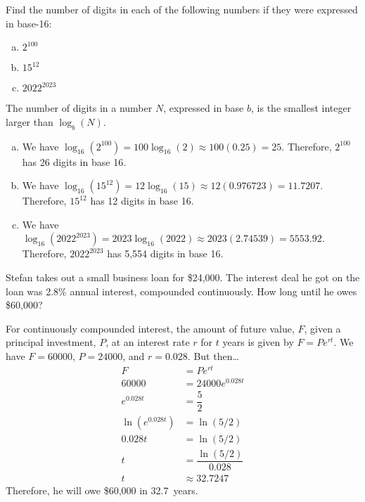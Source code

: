 \documentclass[11pt,letterpaper]{article}
\begin{document}
\newpage



 Find the number of digits in each of the following numbers if they were expressed in base-16:
	\begin{enumerate}[(a)]
	\item $2^{100}$
	\item $15^{12}$
	\item $2022^{2023}$
	\end{enumerate} \pspace

\sol The number of digits in a number $N$, expressed in base $b$, is the smallest integer larger than $\log_b(N)$. 
\begin{enumerate}[(a)]
\item We have $\log_{16}(2^{100})= 100 \log_{16}(2) \approx 100(0.25)= 25$. Therefore, $2^{100}$ has 26 digits in base 16. \pspace

\item We have $\log_{16}(15^{12})= 12 \log_{16}(15) \approx 12(0.976723)= 11.7207$. Therefore, $15^{12}$ has 12 digits in base 16. \pspace
 
\item We have $\log_{16}(2022^{2023})= 2023 \log_{16}(2022) \approx 2023(2.74539)= 5553.92$. Therefore, $2022^{2023}$ has 5,554 digits in base 16.  
\end{enumerate}



\newpage



 Stefan takes out a small business loan for \$24,000. The interest deal he got on the loan was 2.8\% annual interest, compounded continuously. How long until he owes \$60,000? \pspace

\sol For continuously compounded interest, the amount of future value, $F$, given a principal investment, $P$, at an interest rate $r$ for $t$ years is given by $F= Pe^{rt}$. We have $F= 60000$, $P= 24000$, and $r= 0.028$. But then\dots \pspace
	\[
	\begin{aligned}
	F&= Pe^{rt} \\[0.3cm]
	60000&= 24000 e^{0.028t} \\[0.3cm]
	e^{0.028t}&= \dfrac{5}{2} \\[0.3cm]
	\ln(e^{0.028t})&= \ln(5/2) \\[0.3cm]
	0.028t&= \ln(5/2) \\[0.3cm]
	t&= \dfrac{\ln(5/2)}{0.028} \\[0.3cm]
	t&\approx 32.7247
	\end{aligned}
	\] \pspace
Therefore, he will owe \$60,000 in 32.7~years. 
\end{document}
